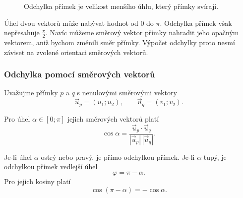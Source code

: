 \begin{figure}[H]
    \centering
    \caption{Odchylka přímek je velikost menšího úhlu, který přímky
    svírají.}
    \label{fig:Angle_between_lines}
\end{figure}

Úhel dvou vektorů může nabývat hodnot od $0$ do $\pi$. Odchylka
přímek však nepřesahuje $\frac{\pi}{2}$. Navíc můžeme směrový vektor
přímky nahradit jeho opačným vektorem, aniž bychom změnili směr
přímky. Výpočet odchylky proto nesmí záviset na zvolené orientaci
směrových vektorů.


\subsubsection{Odchylka pomocí směrových vektorů}
\label{subsubsec:Angle_lines_direction_vectors}

Uvažujme přímky $p$ a $q$ s nenulovými směrovými vektory
\[
    \vec{u}_p=(u_1;u_2),
    \qquad
    \vec{u}_q=(v_1;v_2).
\]

Pro úhel $\alpha\in[0;\pi]$ jejich směrových vektorů platí
\[
    \cos\alpha
    =
    \frac{\vec{u}_p\cdot\vec{u}_q}
    {|\vec{u}_p|\,|\vec{u}_q|}.
\]

Je-li úhel $\alpha$ ostrý nebo pravý, je přímo odchylkou přímek.
Je-li $\alpha$ tupý, je odchylkou přímek vedlejší úhel
\[
    \varphi=\pi-\alpha.
\]
Pro jejich kosiny platí
\[
    \cos(\pi-\alpha)=-\cos\alpha.
\]

